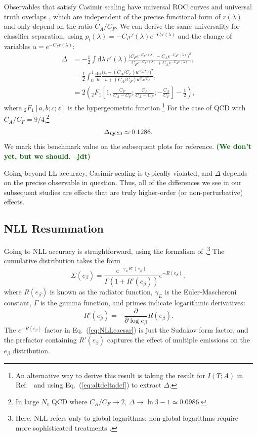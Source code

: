 \documentclass[11pt,letterpaper]{article}
\newcommand{\df}{\text{d}}
\DeclareRobustCommand{\Eq}[1]{Eq.~(\ref{#1})}
\DeclareRobustCommand{\Ref}[1]{Ref.~\cite{#1}}
\newcommand{\be}{\begin{equation}}
\newcommand{\ee}{\end{equation}}
\newcommand{\jdt}[1]{\textbf{\textcolor{darkgreen}{(#1 --jdt)}}}
\begin{document}
Observables that satisfy Casimir scaling have universal ROC curves \cite{} and universal truth overlaps \cite{}, which are independent of the precise functional form of $r(\lambda)$ and only depend on the ratio $C_A/C_F$.  We can derive the same universality for classifier separation, using $p_i(\lambda) = - C_i r'(\lambda) e^{-C_i r(\lambda)}$ and the change of variables $u = e^{-C_F r(\lambda)}$:
\begin{align}
\Delta &=  -\frac{1}{2} \int \df \lambda \, r'(\lambda) \frac{\bigl(C_F e^{-C_F r(\lambda)} - C_A e^{-C_A r(\lambda)}\bigr)^2}{C_F e^{-C_F r(\lambda)}+ C_A e^{-C_A r(\lambda)}} , \\
& = \frac{1}{2} \int_0^1 \frac{\df u}{u} \frac{\bigl(u - (C_A / C_F) u^{C_A/C_F}\bigr)^2}{u + (C_A/C_F) u^{C_A/C_F}} , \\
& = 2 \left({}_2F_1\left[1,\frac{C_F}{C_A - C_F}; \frac{C_A}{C_A - C_F}; - \frac{C_A}{C_F}\right] - \frac{1}{2}  \right),
\end{align}
where ${}_2F_1[a,b;c;z]$ is the hypergeometric function.\footnote{An alternative way to derive this result is taking the result for $I(T;A)$ in \Ref{Larkoski:2014pca} and using \Eq{eq:altdeltadef} to extract $\Delta$.}  For the case of QCD with $C_A/C_F = 9/4$,\footnote{In large $N_c$ QCD where $C_A/C_F \to 2$, $\Delta \to \ln 3 - 1 \simeq 0.0986$.}
\be
\Delta_{\rm QCD} \simeq  0.1286.
\ee
We mark this benchmark value on the subsequent plots for reference.  \jdt{We don't yet, but we should.}  

Going beyond LL accuracy, Casimir scaling is typically violated, and $\Delta$ depends on the precise observable in question.  Thus, all of the differences we see in our subsequent studies are effects that are truly higher-order (or non-perturbative) effects.

\subsection{NLL Resummation}

Going to NLL accuracy is straightforward, using the formalism of \cite{}.\footnote{Here, NLL refers only to global logarithms; non-global logarithms \cite{} require more sophisticated treatments \cite{}.}  The cumulative distribution takes the form
\be
\label{eq:NLLcaesar}
\Sigma(e_\beta) = \frac{e^{-\gamma_E R'(e_\beta)}}{\Gamma\left(1+R'(e_\beta)\right)} e^{-R(e_\beta)} ,
\ee
where $R(e_\beta)$ is known as the radiator function, $\gamma_E$ is the Euler-Mascheroni constant, $\Gamma$ is the gamma function, and primes indicate logarithmic derivatives:
\be
\label{eq:R_der}
R'(e_\beta) = -\frac{\partial}{\partial \log e_\beta} R(e_\beta).
\ee
The $e^{-R(e_\beta)}$ factor in \Eq{eq:NLLcaesar} is just the Sudakov form factor, and the prefactor containing $R'(e_\beta)$ captures the effect of multiple emissions on the $e_\beta$ distribution.
\end{document}
